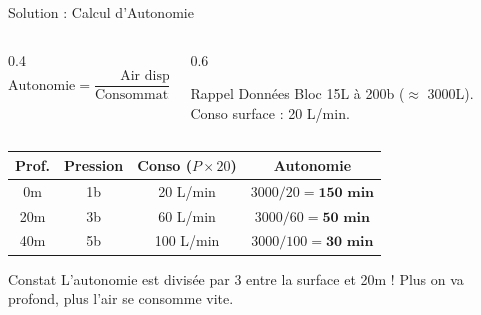 \begin{frame}{Solution : Calcul d'Autonomie}
    \begin{columns}
        \begin{column}{0.4\textwidth}
            $$ \text{Autonomie} = \frac{\text{Air disponible}}{\text{Consommation à prof.}} $$
        \end{column}
        \begin{column}{0.6\textwidth}
            \begin{exampleblock}{Rappel Données}
                Bloc 15L à 200b ($\approx$ 3000L). Conso surface : 20 L/min.
            \end{exampleblock}
        \end{column}
    \end{columns}

    \begin{table}[]
        \centering
        \renewcommand{\arraystretch}{1.3}
        \begin{tabular}{cccc}
        \toprule
        Prof. & Pression & Conso ($P \times 20$) & Autonomie \\
        \midrule
        0m    & 1b       & 20 L/min     & $3000 / 20 = \mathbf{150 \text{ min}}$ \\
        20m   & 3b       & 60 L/min     & $3000 / 60 = \mathbf{50 \text{ min}}$ \\
        40m   & 5b       & 100 L/min    & $3000 / 100 = \mathbf{30 \text{ min}}$ \\
        \bottomrule
        \end{tabular}
    \end{table}
    
    \begin{alertblock}{Constat}
        L'autonomie est divisée par 3 entre la surface et 20m !
        Plus on va profond, plus l'air se consomme vite.
    \end{alertblock}
\end{frame}

